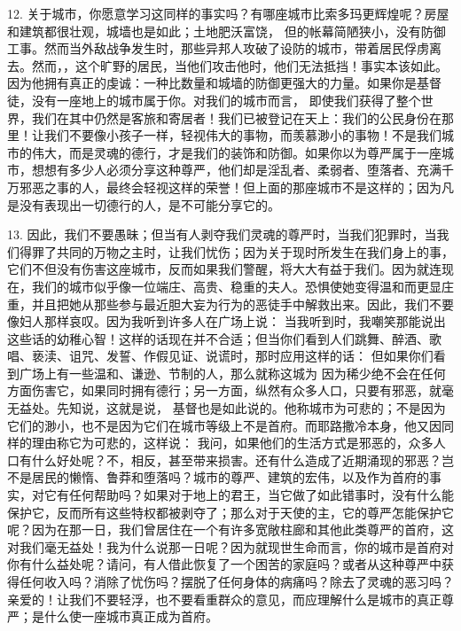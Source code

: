 12. 关于城市，你愿意学习这同样的事实吗？有哪座城市比索多玛更辉煌呢？房屋和建筑都很壮观，城墙也是如此；土地肥沃富饶，  但的帐幕简陋狭小，没有防御工事。然而当外敌战争发生时，那些异邦人攻破了设防的城市，带着居民俘虏离去。然而，，这个旷野的居民，当他们攻击他时，他们无法抵挡！事实本该如此。因为他拥有真正的虔诚：一种比数量和城墙的防御更强大的力量。如果你是基督徒，没有一座地上的城市属于你。对我们的城市而言，  即使我们获得了整个世界，我们在其中仍然是客旅和寄居者！我们已被登记在天上：我们的公民身份在那里！让我们不要像小孩子一样，轻视伟大的事物，而羡慕渺小的事物！不是我们城市的伟大，而是灵魂的德行，才是我们的装饰和防御。如果你以为尊严属于一座城市，想想有多少人必须分享这种尊严，他们却是淫乱者、柔弱者、堕落者、充满千万邪恶之事的人，最终会轻视这样的荣誉！但上面的那座城市不是这样的；因为凡是没有表现出一切德行的人，是不可能分享它的。\par

13. 因此，我们不要愚昧；但当有人剥夺我们灵魂的尊严时，当我们犯罪时，当我们得罪了共同的万物之主时，让我们忧伤；因为关于现时所发生在我们身上的事，它们不但没有伤害这座城市，反而如果我们警醒，将大大有益于我们。因为就连现在，我们的城市似乎像一位端庄、高贵、稳重的夫人。恐惧使她变得温和而更显庄重，并且把她从那些参与最近胆大妄为行为的恶徒手中解救出来。因此，我们不要像妇人那样哀叹。因为我听到许多人在广场上说： 当我听到时，我嘲笑那能说出这些话的幼稚心智！这样的话现在并不合适；但当你们看到人们跳舞、醉酒、歌唱、亵渎、诅咒、发誓、作假见证、说谎时，那时应用这样的话： 但如果你们看到广场上有一些温和、谦逊、节制的人，那么就称这城为 因为稀少绝不会在任何方面伤害它，如果同时拥有德行；另一方面，纵然有众多人口，只要有邪恶，就毫无益处。先知说，这就是说， 基督也是如此说的。他称城市为可悲的；不是因为它们的渺小，也不是因为它们在城市等级上不是首府。而耶路撒冷本身，他又因同样的理由称它为可悲的，这样说：  我问，如果他们的生活方式是邪恶的，众多人口有什么好处呢？不，相反，甚至带来损害。还有什么造成了近期涌现的邪恶？岂不是居民的懒惰、鲁莽和堕落吗？城市的尊严、建筑的宏伟，以及作为首府的事实，对它有任何帮助吗？如果对于地上的君王，当它做了如此错事时，没有什么能保护它，反而所有这些特权都被剥夺了；那么对于天使的主，它的尊严怎能保护它呢？因为在那一日，我们曾居住在一个有许多宽敞柱廊和其他此类尊严的首府，这对我们毫无益处！我为什么说那一日呢？因为就现世生命而言，你的城市是首府对你有什么益处呢？请问，有人借此恢复了一个困苦的家庭吗？或者从这种尊严中获得任何收入吗？消除了忧伤吗？摆脱了任何身体的病痛吗？除去了灵魂的恶习吗？亲爱的！让我们不要轻浮，也不要看重群众的意见，而应理解什么是城市的真正尊严；是什么使一座城市真正成为首府。\par

